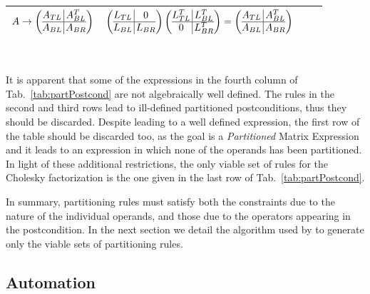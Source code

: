 \documentclass{llncs}
\newcommand{\click}{{\sc{Cl\makebox[.58\width][c]{1}ck}}}
\begin{document}
\begin{table*}
\begin{tabular}{c | c | c | c}
$
         A \rightarrow
         \left( \begin{array}{@{}c@{\,}|@{\,}c@{}} A_{TL} & A_{BL}^T \\\hline A_{BL} & A_{BR} \end{array} \right)
$ &
\renewcommand{\arraystretch}{1.4}
$
\left( \begin{array}{@{}c@{\,}|@{\,}c@{}} L_{TL} & 0 \\\hline L_{BL} & L_{BR} \end{array} \right)
\left( \begin{array}{@{}c@{\,}|@{\,}c@{}} L_{TL}^{T} & L_{BL}^{T} \\\hline 0 & L_{BR}^{T} \end{array} \right)
=
\left( \begin{array}{@{}c@{\,}|@{\,}c@{}} A_{TL} & A_{BL}^T \\\hline A_{BL} & A_{BR} \end{array} \right) $ \\
\bottomrule
\end{tabular}\\[1mm]
\caption{Application of the different combinations of partitioning rules to the postcondition.} \label{tab:partPostcond}
\end{table*}

It is apparent that some of the expressions in the
fourth column of Tab.~\ref{tab:partPostcond} are not algebraically well defined.  
The rules in the
second and third rows lead to ill-defined partitioned postconditions,
thus they should be discarded.
Despite leading to a well defined expression, the first row of the table should
be discarded too, as the goal is a {\it Partitioned} Matrix Expression
and it leads to an expression 
in which none of the operands has been partitioned.
In light of these additional restrictions, the only viable set
of rules for the Cholesky factorization is the one given in the last row of 
Tab.~\ref{tab:partPostcond}. 

In summary, partitioning rules must satisfy
both the constraints due to the nature of the individual operands, 
and those due to the operators appearing in the postcondition. 
In the next section we detail the algorithm used by \click{} to
generate only the viable sets of partitioning rules.

\subsection{Automation} \label{subsec:automation}
\end{document}
